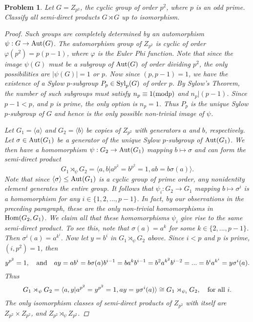 \documentclass[11pt]{article}
\newcommand{\1}{\textbf{1}}
\newtheorem{prob}{Problem}
\begin{document}
\begin{prob}
Let $G = Z_{p^2}$, the cyclic group of order $p^2$, where $p$ is an odd prime. Classify all semi-direct products $G\rtimes G$ up to isomorphism. 

\begin{proof}
Such groups are completely determined by an automorphism $\psi:G\rightarrow\textnormal{Aut}(G)$. The automorphism group of $Z_{p^2}$ is cyclic of order $\varphi(p^2) = p(p-1)$, where $\varphi$ is the Euler Phi function. Note that since the image $\psi(G)$ must be a subgroup of $\textnormal{Aut}(G)$ of order dividing $p^2$, the only possibilities are $|\psi(G)| = 1$ or $p$. Now since $(p,p-1) = 1$, we have the existence of a Sylow $p$-subgroup $P_p\in\textnormal{Syl}_p(G)$ of order $p$. By Sylow's Theorem, the number of such subgroups must satisfy $n_p\equiv 1(\textnormal{mod} p)$ and $n_p| (p-1)$. Since $p-1 < p$, and $p$ is prime, the only option is $n_p = 1$. Thus $P_p$ is the unique Sylow $p$-subgroup of $G$ and hence is the only possible non-trivial image of $\psi$. 

Let $G_1 = \langle a \rangle $ and $G_2 = \langle b\rangle$ be copies of $Z_{p^2}$ with generators $a$ and $b$, respectively. Let $\sigma\in\textnormal{Aut}(G_1)$ be a generator of the unique Sylow $p$-subgroup of $\textnormal{Aut}(G_1)$. We then have a homomorphism $\psi:G_2\rightarrow \textnormal{Aut}(G_1)$ mapping $b\mapsto \sigma$ and can form the semi-direct product \[G_1\rtimes_\psi G_2 = \langle a, b\big| a^{p^2} = b^{p^2} = 1, ab = b\sigma (a) \rangle.\] Note that since $\langle\sigma\rangle\leq\textnormal{Aut}(G_1)$ is a cyclic group of prime order, any nonidentity element generates the entire group. It follows that $\psi_i:G_2\rightarrow G_1$ mapping $b\mapsto \sigma^i$ is a homomorphism for any $i\in\{1,2,...,p-1\}$. In fact, by our observations in the preceding paragraph, these are the only non-trivial homomorphisms in $\textnormal{Hom}(G_2,G_1)$. We claim all that these homomorphisms $\psi_i$ give rise to the same semi-direct product. To see this, note that $\sigma (a) = a^k$ for some $k\in\{2,...,p-1\}$. Then $\sigma^i (a) = a^{k^i}$. Now let $y = b^i$ in $G_1\rtimes_\psi G_2$ above. Since $i < p$ and $p$ is prime, $(i,p^2) = 1$, then \[y^{p^2} = 1,\quad \textnormal{and}\quad  ay = ab^i = b\sigma (a) b^{i-1} = b a^k b^{i-1} = b^2 a^{k^2}b^{i-2} = ... = b^i a^{k^i} = y\sigma^i (a).\] Thus \[G_1\rtimes_\psi G_2 = \langle  a, y | a^{p^2} = y^{p^2} =1, ay  = y\sigma^i (a)  \rangle \cong G_1 \rtimes_{\psi_i} G_2,\quad \textnormal{for all $i$}.\] The only isomorphism classes of semi-direct products of $Z_{p^2}$ with itself are $Z_{p^2}\times Z_{p^2}$, and $Z_{p^2}\rtimes_{\psi}Z_{p^2}$. 
\end{proof}
\end{prob}
\end{document}
